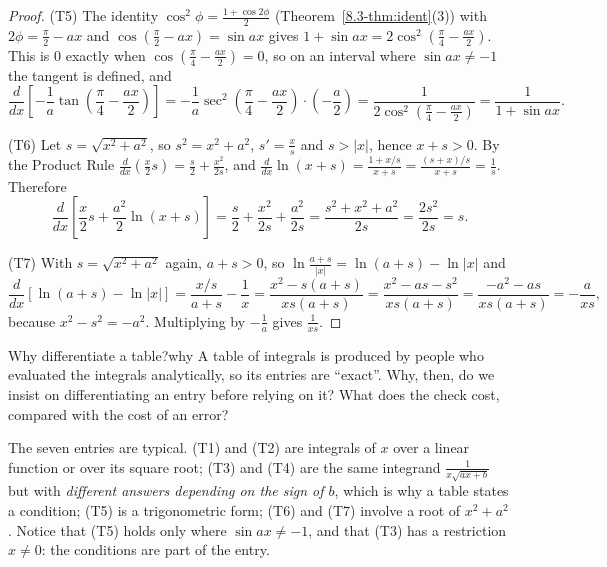 \documentclass[11pt]{article}
\begin{document}
\begin{proof}
(T5) The identity $\cos^2\phi=\frac{1+\cos2\phi}2$ (Theorem~\ref{8.3-thm:ident}(3)) with $2\phi=\frac\pi2-ax$ and $\cos\left(\frac\pi2-ax\right)=\sin ax$ gives $1+\sin ax=2\cos^2\left(\frac\pi4-\frac{ax}2\right)$. This is $0$ exactly when $\cos\left(\frac\pi4-\frac{ax}2\right)=0$, so on an interval where $\sin ax\ne-1$ the tangent is defined, and
\[\frac d{dx}\left[-\frac1a\tan\left(\frac\pi4-\frac{ax}2\right)\right]=-\frac1a\sec^2\left(\frac\pi4-\frac{ax}2\right)\cdot\left(-\frac a2\right)=\frac1{2\cos^2\left(\frac\pi4-\frac{ax}2\right)}=\frac1{1+\sin ax}.\]

(T6) Let $s=\sqrt{x^2+a^2}$, so $s^2=x^2+a^2$, $s'=\frac xs$ and $s>\lvert x\rvert$, hence $x+s>0$. By the Product Rule $\frac d{dx}\left(\frac x2s\right)=\frac s2+\frac{x^2}{2s}$, and $\frac d{dx}\ln(x+s)=\frac{1+x/s}{x+s}=\frac{(s+x)/s}{x+s}=\frac1s$. Therefore
\[\frac d{dx}\left[\frac x2s+\frac{a^2}2\ln(x+s)\right]=\frac s2+\frac{x^2}{2s}+\frac{a^2}{2s}=\frac{s^2+x^2+a^2}{2s}=\frac{2s^2}{2s}=s.\]

(T7) With $s=\sqrt{x^2+a^2}$ again, $a+s>0$, so $\ln\frac{a+s}{\lvert x\rvert}=\ln(a+s)-\ln\lvert x\rvert$ and
\[\frac d{dx}\left[\ln(a+s)-\ln\lvert x\rvert\right]=\frac{x/s}{a+s}-\frac1x=\frac{x^2-s(a+s)}{xs(a+s)}=\frac{x^2-as-s^2}{xs(a+s)}=\frac{-a^2-as}{xs(a+s)}=-\frac a{xs},\]
because $x^2-s^2=-a^2$. Multiplying by $-\frac1a$ gives $\frac1{xs}$.
\end{proof}

\begin{think}{Why differentiate a table?}{why}
A table of integrals is produced by people who evaluated the integrals analytically, so its entries are ``exact''. Why, then, do we insist on differentiating an entry before relying on it? What does the check cost, compared with the cost of an error?
\end{think}

The seven entries are typical. (T1) and (T2) are integrals of $x$ over a linear function or over its square root; (T3) and (T4) are the same integrand $\frac1{x\sqrt{ax+b}}$ but with \emph{different answers depending on the sign of $b$}, which is why a table states a condition; (T5) is a trigonometric form; (T6) and (T7) involve a root of $x^2+a^2$. Notice that (T5) holds only where $\sin ax\ne-1$, and that (T3) has a restriction $x\ne0$: the conditions are part of the entry.
\end{document}
